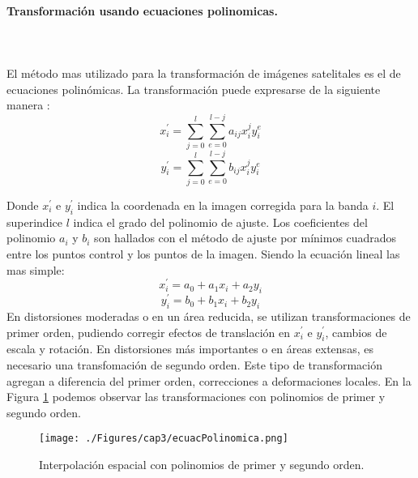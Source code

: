 \paragraph{Transformaci\'on usando ecuaciones polinomicas. }\mbox{}\\\mbox{}\\
El m\'etodo mas utilizado para la transformaci\'on de im\'agenes satelitales  es el de ecuaciones polin\'omicas. La transformaci\'on puede expresarse de la siguiente manera \cite{guide1999erdas}:
	\begin{equation}
	x^{'}_{i} = \sum_{j=0}^{l} \sum_{e=0}^{l-j} a_{ij}x^{j}_{i}y^{e}_{i}
	\end{equation} 
		\begin{equation}
		y^{'}_{i} = \sum_{j=0}^{l} \sum_{e=0}^{l-j} b_{ij}x^{j}_{i}y^{e}_{i}
		\end{equation} 


Donde $ x^{'}_{i} $ e $ y^{'}_{i} $ indica la coordenada en la imagen corregida para la banda $ i $. El superindice $ l $ indica el grado del polinomio de ajuste. Los coeficientes del polinomio $ a_{i} $ y $ b_{i} $ son hallados con el m\'etodo de ajuste por m\'inimos cuadrados entre los puntos control y los puntos de la imagen. Siendo la ecuaci\'on lineal las mas simple:
	\begin{equation}
	x^{'}_{i} = a_{0}+a_{1}x_{i}+a_{2}y_{i}
	\end{equation} 
		\begin{equation}
		y^{'}_{i} = b_{0}+b_{1}x_{i}+b_{2}y_{i}
		\end{equation} 
En distorsiones moderadas o en un \'area reducida, se utilizan transformaciones de primer orden, pudiendo corregir efectos de translaci\'on en $ x^{'}_{i} $ e $ y^{'}_{i} $, cambios de escala y rotaci\'on.
En distorsiones m\'as importantes o en \'areas extensas, es necesario una transfomaci\'on de segundo orden. Este tipo de transformaci\'on agregan a diferencia del primer orden, correcciones a deformaciones locales.
En la Figura \ref{fig:intPolEcua} podemos observar las transformaciones con polinomios de primer y segundo orden.
    \begin{figure}[H]
    	\centering
    	\texttt{[image: ./Figures/cap3/ecuacPolinomica.png]}
    	\caption{Interpolaci\'on espacial con polinomios de primer y segundo orden.}
    	\label{fig:intPolEcua}
    \end{figure}
    
